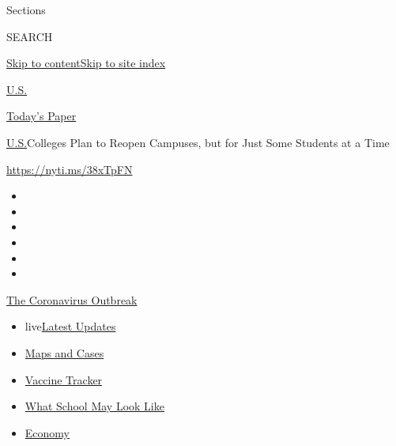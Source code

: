 Sections

SEARCH

\protect\hyperlink{site-content}{Skip to
content}\protect\hyperlink{site-index}{Skip to site index}

\href{https://www.nytimes.com/section/us}{U.S.}

\href{https://myaccount.nytimes.com/auth/login?response_type=cookie\&client_id=vi}{}

\href{https://www.nytimes.com/section/todayspaper}{Today's Paper}

\href{/section/us}{U.S.}\textbar{}Colleges Plan to Reopen Campuses, but
for Just Some Students at a Time

\url{https://nyti.ms/38xTpFN}

\begin{itemize}
\item
\item
\item
\item
\item
\item
\end{itemize}

\href{https://www.nytimes.com/news-event/coronavirus?action=click\&pgtype=Article\&state=default\&region=TOP_BANNER\&context=storylines_menu}{The
Coronavirus Outbreak}

\begin{itemize}
\tightlist
\item
  live\href{https://www.nytimes.com/2020/08/02/world/coronavirus-updates.html?action=click\&pgtype=Article\&state=default\&region=TOP_BANNER\&context=storylines_menu}{Latest
  Updates}
\item
  \href{https://www.nytimes.com/interactive/2020/us/coronavirus-us-cases.html?action=click\&pgtype=Article\&state=default\&region=TOP_BANNER\&context=storylines_menu}{Maps
  and Cases}
\item
  \href{https://www.nytimes.com/interactive/2020/science/coronavirus-vaccine-tracker.html?action=click\&pgtype=Article\&state=default\&region=TOP_BANNER\&context=storylines_menu}{Vaccine
  Tracker}
\item
  \href{https://www.nytimes.com/interactive/2020/07/29/us/schools-reopening-coronavirus.html?action=click\&pgtype=Article\&state=default\&region=TOP_BANNER\&context=storylines_menu}{What
  School May Look Like}
\item
  \href{https://www.nytimes.com/live/2020/07/31/business/stock-market-today-coronavirus?action=click\&pgtype=Article\&state=default\&region=TOP_BANNER\&context=storylines_menu}{Economy}
\end{itemize}

